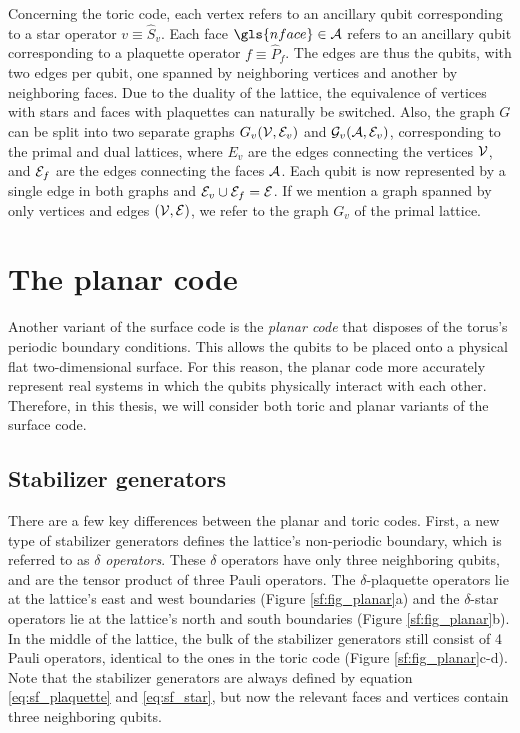 Concerning the toric code, each vertex refers to an ancillary qubit corresponding to a star operator $v\equiv \hat{S}_v$. Each face $\gls{nface}\in \m{A}$ refers to an ancillary qubit corresponding to a plaquette operator $f\equiv \hat{P}_f$. The edges are thus the qubits, with two edges per qubit, one spanned by neighboring vertices and another by neighboring faces. Due to the duality of the lattice, the equivalence of vertices with stars and faces with plaquettes can naturally be switched. Also, the graph $G$ can be split into two separate graphs $G_v(\mathcal{V}, \mathcal{E}_v)$ and $\mathcal{G}_v(\mathcal{A}, \mathcal{E}_v)$, corresponding to the primal and dual lattices, where $E_v$ are the edges connecting the vertices $\mathcal{V}$, and $\mathcal{E}_f$ are the edges connecting the faces $\mathcal{A}$. Each qubit is now represented by a single edge in both graphs and $\mathcal{E}_v\cup \mathcal{E}_f=\mathcal{E}$. If we mention a graph spanned by only vertices and edges $(\mathcal{V},\mathcal{E})$, we refer to the graph $G_v$ of the primal lattice. 


\section{The planar code}\label{sec:surface_planar}
Another variant of the surface code is the \emph{planar code} that disposes of the torus's periodic boundary conditions. This allows the qubits to be placed onto a physical flat two-dimensional surface. For this reason, the planar code more accurately represent real systems in which the qubits physically interact with each other. Therefore, in this thesis, we will consider both toric and planar variants of the surface code.


\subsection{Stabilizer generators}
There are a few key differences between the planar and toric codes. First, a new type of stabilizer generators defines the lattice's non-periodic boundary, which is referred to as \emph{$\delta$ operators}. These $\delta$ operators have only three neighboring qubits, and are the tensor product of three Pauli operators. The $\delta$-plaquette operators lie at the lattice's east and west boundaries (Figure \ref{sf:fig_planar}a) and the $\delta$-star operators lie at the lattice's north and south boundaries (Figure \ref{sf:fig_planar}b). In the middle of the lattice, the bulk of the stabilizer generators still consist of 4 Pauli operators, identical to the ones in the toric code (Figure \ref{sf:fig_planar}c-d). Note that the stabilizer generators are always defined by equation \eqref{eq:sf_plaquette} and \eqref{eq:sf_star}, but now the relevant faces and vertices contain three neighboring qubits.


